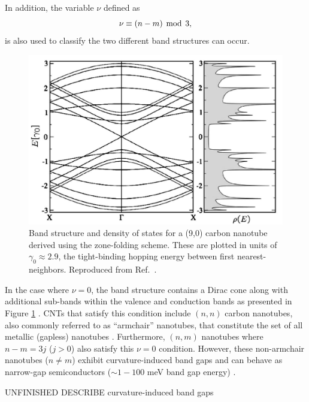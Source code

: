 In addition, the variable $\nu$ defined as
%
\begin{equation}
\label{eq:nu_cnt}
\nu \equiv (n-m) \mathrm{\hspace{1.5mm} mod \hspace{1.5mm}} 3,
\end{equation}
%
is also used to classify the two different band structures can occur.
%
\begin{figure}[h]
	\centering
	\includegraphics[scale=0.3]{images/chapter_optical_props/nine_zero_band_charlier}
	\caption{Band structure and density of states for a (9,0) carbon nanotube derived using the zone-folding scheme. These are plotted in units of $\gamma_0 \approx 2.9$, the tight-binding hopping energy between first nearest-neighbors. Reproduced from Ref.\ \cite{charlier2007electronic}.}
	\label{fig:nine_zero_cnt}
\end{figure}
%
In the case where $\nu = 0 $, the band structure contains a Dirac cone along with additional sub-bands within the valence and conduction bands as presented in Figure \ref{fig:nine_zero_cnt} . CNTs that satisfy this condition include $(n,n)$ carbon nanotubes, also commonly referred to as ``armchair'' nanotubes, that constitute the set of all metallic (gapless) nanotubes \cite{nanot2012optoelectronic}. Furthermore, $(n,m)$ nanotubes where $n-m = 3j$ ($j > 0$) also satisfy this $\nu = 0$ condition. However, these non-armchair nanotubes ($n\neq m$) exhibit curvature-induced band gaps and can behave as narrow-gap semiconductors ($\sim1 - 100$ meV band gap energy) \cite{nanot2012optoelectronic}.

{\color{red} UNFINISHED DESCRIBE curvature-induced band gaps}



